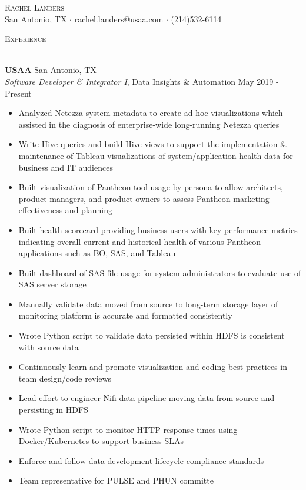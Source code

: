 \documentclass[a4paper]{article}
\newcommand{\lineunder} {
    \vspace*{-8pt} \\
    \hspace*{-18pt} \hrulefill \\
}
\newcommand{\header} [1] {
    {\hspace*{-18pt}\vspace*{6pt} \textsc{#1}}
    \vspace*{-6pt} \lineunder
}
\begin{document}
\vspace*{-10pt}

    

\vspace*{-40pt}
\begin{center}
	{\Huge \scshape {Rachel Landers}}\\
	San Antonio, TX $\cdot$ rachel.landers@usaa.com $\cdot$ (214)532-6114\\
\end{center}

\header{Experience}
\vspace{1mm}

\textbf{USAA} \hfill San Antonio, TX\\
\textit{Software Developer \& Integrator I}, Data Insights \& Automation \hfill May 2019 - Present\\
\vspace{-1mm}
\begin{itemize} \itemsep .5pt
	\item Analyzed Netezza system metadata to create ad-hoc visualizations which assisted in the diagnosis of enterprise-wide long-running Netezza queries
        \item Write Hive queries and build Hive views to support the implementation \& maintenance of Tableau visualizations of system/application health data for business and IT audiences
	\item Built visualization of Pantheon tool usage by persona to allow architects, product managers, and product owners to assess Pantheon marketing effectiveness and planning
	\item Built health scorecard providing business users with key performance metrics indicating overall current and historical health of various Pantheon applications such as BO, SAS, and Tableau
	\item Built dashboard of SAS file usage for system administrators to evaluate use of SAS server storage
        \item Manually validate data moved from source to long-term storage layer of monitoring platform is accurate and formatted consistently
        \item Wrote Python script to validate data persisted within HDFS is consistent with source data
        \item Continuously learn and promote visualization and coding best practices in team design/code reviews
        \item Lead effort to engineer Nifi data pipeline moving data from source and persisting in HDFS
        \item Wrote Python script to monitor HTTP response times using Docker/Kubernetes to support business SLAs
        \item Enforce and follow data development lifecycle compliance standards
	\item Team representative for PULSE and PHUN committe
\end{itemize}
\end{document}

